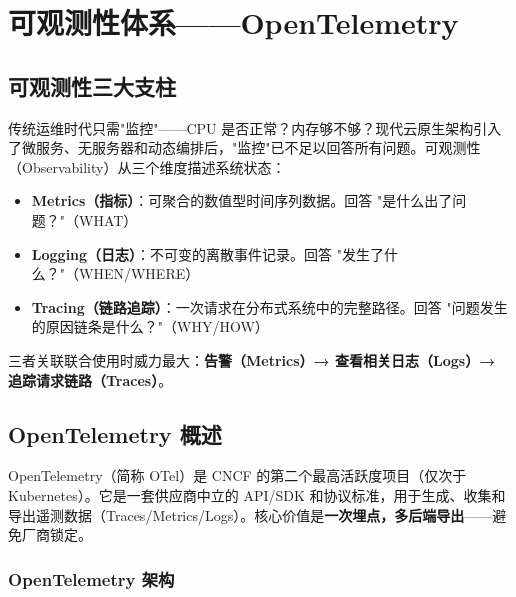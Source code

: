 \documentclass[12pt,UTF8]{ctexbook}
\begin{document}
\chapter{可观测性体系——OpenTelemetry}
\label{chap:opentelemetry}

\section{可观测性三大支柱}
\label{sec:observability-pillars}

传统运维时代只需"监控"——CPU 是否正常？内存够不够？现代云原生架构引入了微服务、无服务器和动态编排后，"监控"已不足以回答所有问题。可观测性（Observability）从三个维度描述系统状态：

\begin{itemize}
    \item \textbf{Metrics（指标）}：可聚合的数值型时间序列数据。回答 "是什么出了问题？"（WHAT）
    \item \textbf{Logging（日志）}：不可变的离散事件记录。回答 "发生了什么？"（WHEN/WHERE）
    \item \textbf{Tracing（链路追踪）}：一次请求在分布式系统中的完整路径。回答 "问题发生的原因链条是什么？"（WHY/HOW）
\end{itemize}

三者关联联合使用时威力最大：\textbf{告警（Metrics）→ 查看相关日志（Logs）→ 追踪请求链路（Traces）}。

\section{OpenTelemetry 概述}
\label{sec:otel-overview}

OpenTelemetry（简称 OTel）是 CNCF 的第二个最高活跃度项目（仅次于 Kubernetes）。它是一套供应商中立的 API/SDK 和协议标准，用于生成、收集和导出遥测数据（Traces/Metrics/Logs）。核心价值是\textbf{一次埋点，多后端导出}——避免厂商锁定。

\subsection*{OpenTelemetry 架构}
\end{document}
